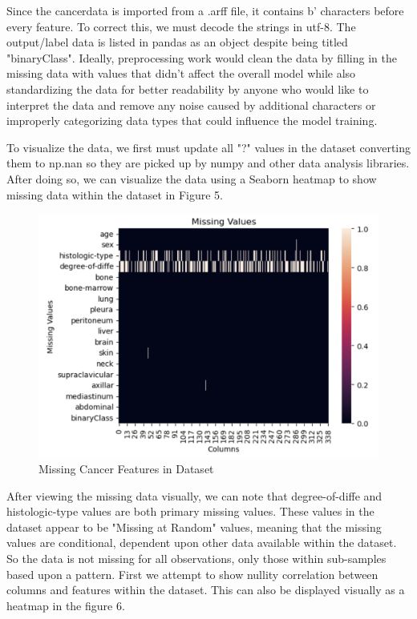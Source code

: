 \documentclass[titlepage]{article}
\begin{document}
\vspace{.5cm}\noindent Since the cancerdata is imported from a .arff file, it contains b' characters before every feature. To correct this, we must decode the strings in utf-8. The output/label data is listed in pandas as an object despite being titled "binaryClass". Ideally, preprocessing work would clean the data by filling in the missing data with values that didn't affect the overall model while also standardizing the data for better readability by anyone who would like to interpret the data and remove any noise caused by additional characters or improperly categorizing data types that could influence the model training.  

\vspace{.5cm}\noindent To visualize the data, we first must update all "?" values in the dataset converting them to np.nan so they are picked up by numpy \cite{numpyisnan} and other data analysis libraries.  After doing so, we can visualize the data using a Seaborn \cite{seaborn} heatmap to show missing data within the dataset in Figure 5.  

\begin{figure}
	\centering
	\includegraphics[width=0.65\linewidth]{img/cancerheatmap.png}
	\caption{Missing Cancer Features in Dataset}
	\label{fig:cancerheatmap}
\end{figure}

\vspace{.5cm}\noindent After viewing the missing data visually, we can note that degree-of-diffe and histologic-type values are both primary missing values.  These values in the dataset appear to be "Missing at Random" values, meaning that the missing values are conditional, dependent upon other data available within the dataset.  So the data is not missing for all observations, only those within sub-samples based upon a pattern.    First we attempt to show nullity correlation between columns and features within the dataset.  This can also be displayed visually as a heatmap in the figure 6.
\end{document}
